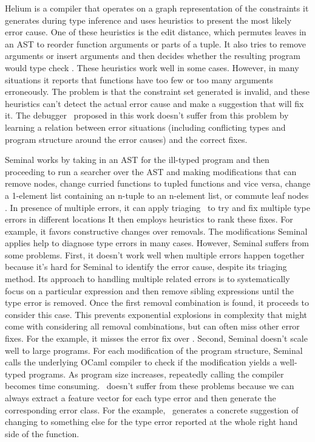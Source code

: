 \documentclass[12pt]{report}	%
\begin{document}
Helium \cite{Hage07:HTE} is a compiler that operates
on a graph representation of the constraints it generates
during type inference
and uses heuristics to present the most likely error cause. One
of these heuristics is the edit distance, which permutes leaves in
an AST to reorder function arguments or parts of a
tuple. It also tries to remove arguments or insert arguments and
then decides whether the resulting program would type check \cite{Heeren03:HLH}.
These heuristics work well in some cases. However, in many situations it
reports that functions have too few or too many arguments erroneously.
%
The problem is that the constraint
set generated is invalid, and these heuristics can't detect
the actual error cause and make a suggestion that will fix it.
%
The debugger \newCompiler\ proposed in this work doesn't suffer from this problem by learning
a relation between error situations (including conflicting types
and program structure around the error causes) and the correct fixes.


Seminal works by taking in an AST for the ill-typed program
and then proceeding to run a searcher over the AST and
making modifications that can remove nodes, change curried functions
to tupled functions and vice versa, change a 1-element list containing an n-tuple to an n-element list, or commute leaf nodes \cite{Lerner07:STM}.
In presence of multiple errors, it can apply triaging~\cite{Lerner07:STM}
to try and fix multiple type errors in different locations
It then employs heuristics to rank
these fixes. For example, it favors constructive changes over removals.
The modifications Seminal applies help to diagnose type
errors in many cases. However, Seminal suffers from
some problems. First, it doesn't work well when multiple errors
happen together because it's hard for Seminal to identify the error
cause, despite its triaging method.
%
Its approach to handling
multiple related errors is to systematically focus on a particular
expression and then remove sibling expressions until the type
error is removed. Once the first removal combination is found, it
proceeds to consider this case.
This prevents exponential explosions in complexity
that might come with considering all removal combinations,
but can often miss other error fixes. For the  
example, it misses the error fix over .
%
Second, Seminal doesn't scale well to large programs.
For each modification of the program structure, Seminal calls
the underlying OCaml compiler to check if the modification yields
a well-typed programs. As program size increases, repeatedly calling
the compiler becomes time consuming.
%
\newCompiler\ doesn't suffer from these problems because
we can always extract a feature vector for each type error and
then generate the corresponding error class. 
For the  example,
\newCompiler\ generates a concrete suggestion of changing \prog{++}
to something else for the type error reported at the whole right
hand side of the function.
\end{document}
